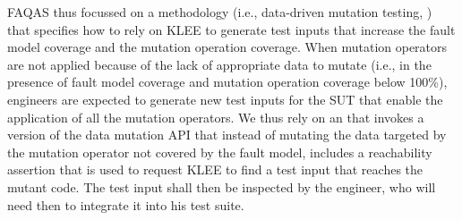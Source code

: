 FAQAS thus focussed on a methodology (i.e., data-driven mutation testing, ) that specifies how to rely on KLEE to generate test inputs that increase the fault model coverage and the mutation operation coverage.
When mutation operators are not applied because of the lack of appropriate data to mutate (i.e., in the presence of fault model coverage and mutation operation coverage below 100\%), engineers are expected to generate new test inputs for the SUT that enable the application of all the mutation operators. 
We thus rely on an   that
invokes a version of the data mutation API that instead of mutating the data targeted by the mutation operator not covered by the fault model, includes a reachability assertion that is used to request KLEE to find a test input that reaches the mutant code. The test input shall then be inspected by the engineer, who will need then to integrate it into his test suite.
%
%
%
%







